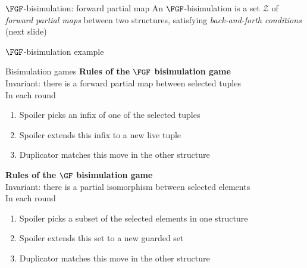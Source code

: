 \documentclass[aspectratio=169]{beamer}
\begin{document}
\begin{frame}{$\FGF$-bisimulation: forward partial map}
  An $\FGF$-bisimulation is a set $\mathcal{Z}$ of \emph{forward partial maps} between two structures, satisfying \emph{back-and-forth conditions} (next slide)
  \begin{center}
    
  \end{center}
\end{frame}


\begin{frame}{$\FGF$-bisimulation example}
  
\end{frame}

\begin{frame}{Bisimulation games}
  \textbf{Rules of the $\FGF$ bisimulation game}\\
  Invariant: there is a forward partial map between selected tuples\\[2ex]
  In each round \begin{minipage}{0.8\textwidth}
  \begin{enumerate}
    \item Spoiler picks an infix of one of the selected tuples
    \item Spoiler extends this infix to a new live tuple
    \item Duplicator matches this move in the other structure
  \end{enumerate}
  \end{minipage}

  \vspace{3ex}
  \pause
  \textbf{Rules of the \alert{$\GF$} bisimulation game}\\
  Invariant: there is a \alert{partial isomorphism} between selected \alert{elements}\\[2ex]
  In each round \begin{minipage}{0.82\textwidth}
  \begin{enumerate}
    \item Spoiler picks \alert{a subset} of the selected elements in one structure
    \item Spoiler extends this set to a new \alert{guarded set}
    \item Duplicator matches this move in the other structure
  \end{enumerate}
  \end{minipage}
\end{frame}
\end{document}
